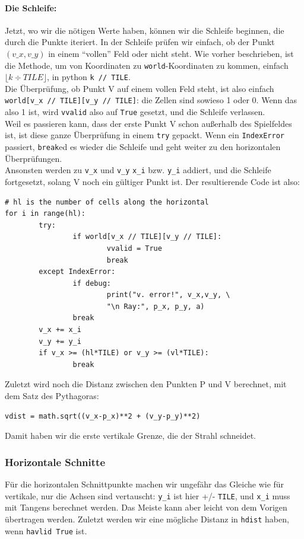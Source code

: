 \documentclass[a4paper,12pt]{report}
\begin{document}
\paragraph{Die Schleife:}
Jetzt, wo wir die n\"otigen Werte haben, k\"onnen wir die Schleife beginnen, die durch die Punkte iteriert. In der Schleife pr\"ufen wir einfach, ob der Punkt $(v\_x,v\_y)$ in einem ``vollen'' Feld oder nicht steht. Wie vorher beschrieben, ist die Methode, um von Koordinaten zu \texttt{world}-Koordinaten zu kommen, einfach $\lfloor k \div TILE \rfloor$, in python \texttt{k // TILE}. \\
Die Überpr\"ufung, ob Punkt V auf einem vollen Feld steht, ist also einfach \texttt{world[v\_x // TILE][v\_y // TILE]}: die Zellen sind sowieso 1 oder 0. Wenn das also 1 ist, wird \texttt{vvalid} also auf \texttt{True} gesetzt, und die Schleife verlassen. \\
Weil es passieren kann, dass der erste Punkt V schon au\ss erhalb des Spielfeldes ist, ist diese ganze Überpr\"ufung in einem \texttt{try} gepackt. Wenn ein \texttt{IndexError} passiert, \texttt{break}ed es wieder die Schleife und geht weiter zu den horizontalen Überpr\"ufungen. \\
Ansonsten werden zu \texttt{v\_x} und \texttt{v\_y} \texttt{x\_i} bzw. \texttt{y\_i} addiert, und die Schleife fortgesetzt, solang V noch ein g\"ultiger Punkt ist. Der resultierende Code ist also:
\begin{Verbatim}[baselinestretch=1.0, xleftmargin=1cm]
# hl is the number of cells along the horizontal
for i in range(hl):
        try:
                if world[v_x // TILE][v_y // TILE]:
                        vvalid = True
                        break
        except IndexError:
                if debug:
                        print("v. error!", v_x,v_y, \
                        "\n Ray:", p_x, p_y, a)
                break
        v_x += x_i
        v_y += y_i
        if v_x >= (hl*TILE) or v_y >= (vl*TILE):
                break
\end{Verbatim}

Zuletzt wird noch die Distanz zwischen den Punkten P und V berechnet, mit dem Satz des Pythagoras:
\begin{Verbatim}[baselinestretch=1.0, xleftmargin=1cm]
vdist = math.sqrt((v_x-p_x)**2 + (v_y-p_y)**2)
\end{Verbatim}
Damit haben wir die erste vertikale Grenze, die der Strahl schneidet.

\subsubsection{Horizontale Schnitte}
F\"ur die horizontalen Schnittpunkte machen wir ungef\"ahr das Gleiche wie f\"ur vertikale, nur die Achsen sind vertauscht: \texttt{y\_i} ist hier +/- \texttt{TILE}, und \texttt{x\_i} muss mit Tangens berechnet werden. Das Meiste kann aber leicht von dem Vorigen \"ubertragen werden. Zuletzt werden wir eine m\"ogliche Distanz in \texttt{hdist} haben, wenn \texttt{havlid True} ist.
\end{document}
